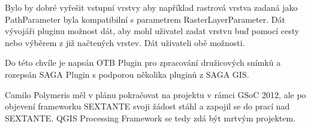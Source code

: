 Bylo by dobré vyřešit vstupní vrstvy aby například rastrová vrstva zadaná jako PathParameter byla kompatibilní s parametrem RasterLayerParameter. Dát vývojáři pluginu možnost dát, aby mohl  uživatel zadat vrstvu buď pomocí cesty nebo výběrem z již načtených vrstev. Dát uživateli obě možnosti.

Do této chvíle je napsán OTB Plugin pro zpracování družicových snímků a rozepsán SAGA Plugin s podporou několika pluginů z SAGA GIS.

Camilo Polymeris měl v plánu pokračovat na projektu v rámci GSoC 2012, ale po objevení frameworku SEXTANTE svoji žádost stáhl a zapojil se do prací nad SEXTANTE. QGIS Processing Framework se tedy zdá být mrtvým projektem.

\newpage
